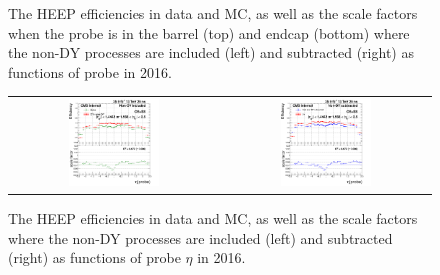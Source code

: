 \begin{figure}[htp]
\begin{center}
\begin{tabular}{cc}
    \end{tabular}
    \caption{The HEEP efficiencies in data and MC, as well as the scale factors when the probe is in the barrel (top) and endcap (bottom) where the non-DY processes are included (left) and subtracted (right) as functions of probe \et in 2016.}
    \label{fig:eff_SS_nominal_ET_2016}
  \end{center}
\end{figure}

\begin{figure}[htp]
  \begin{center}
    \begin{tabular}{cc}
      \includegraphics[width=0.45\textwidth]{figures/Zprime/2016/ScaleFactor/SameSign/nominal/g_compare_cut_eta_Barrel+Endcap_ea_ta_inc_AS_nominal_PUW.png} &
      \includegraphics[width=0.45\textwidth]{figures/Zprime/2016/ScaleFactor/SameSign/nominal/g_compare_cut_eta_Barrel+Endcap_ea_ta_exc_AS_nominal_PUW.png} \\
    \end{tabular}
    \caption{The HEEP efficiencies in data and MC, as well as the scale factors where the non-DY processes are included (left) and subtracted (right) as functions of probe $\eta$ in 2016.}
    \label{fig:eff_SS_nominal_eta_2016}
  \end{center}
\end{figure}

